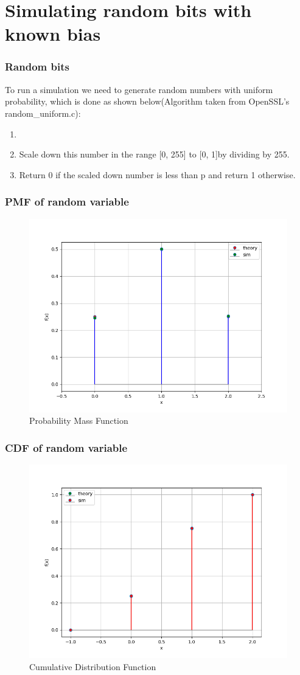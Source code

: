 \documentclass{beamer}
\theoremstyle{remark}
\numberwithin{equation}{section}
\begin{document}
\section{Simulating random bits with known bias}
\begin{frame}
\frametitle{Random bits}
To run a simulation we need to generate random numbers with uniform probability, which is done
as shown below(Algorithm taken from OpenSSL's random\_uniform.c):
\begin{enumerate}
  \item {}
  \item Scale down this number in the range [0, 255] to [0, 1]by dividing by 255.
  \item Return 0 if the scaled down number is less than p and return 1 otherwise. 
\end{enumerate}
\end{frame}
\begin{frame}
\frametitle{PMF of random variable}
\begin{figure}[h!]
   \centering
   \includegraphics[width=0.7\columnwidth]{figs/fig1.png}
    \caption{Probability Mass Function}
\end{figure}

\end{frame}
\begin{frame}
  \frametitle{CDF of random variable}
\begin{figure}[h!]
   \centering
   \includegraphics[width=0.7\columnwidth]{figs/fig2.png}
    \caption{Cumulative Distribution Function}
\end{figure}
\end{frame}
\end{document}
